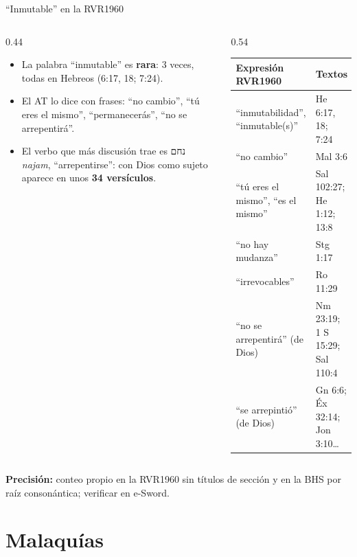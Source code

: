 \documentclass[hyperref={bookmarks=false},aspectratio=169]{beamer}
\newcommand{\heb}[1]{\mbox{\foreignlanguage{hebrew}{#1}}}
\newcommand{\destacar}[1]{\textbf{\textcolor{azul}{#1}}}
\newcommand{\precision}[1]{{\footnotesize\color{gris}\textbf{Precisión:} #1}}
\begin{document}
\begin{frame}{``Inmutable'' en la RVR1960}
\begin{columns}[c,onlytextwidth]
\begin{column}{0.44\textwidth}\footnotesize
\begin{itemize}
\item La palabra ``inmutable'' es \destacar{rara}: 3 veces, todas en Hebreos (6:17, 18; 7:24).
\item El AT lo dice con frases: ``no cambio'', ``tú eres el mismo'', ``permanecerás'', ``no se arrepentirá''.
\item El verbo que más discusión trae es \heb{נחם} \emph{najam}, ``arrepentirse'': con Dios como sujeto aparece en unos \textbf{34 versículos}.
\end{itemize}
\end{column}
\begin{column}{0.54\textwidth}
\scriptsize\renewcommand{\arraystretch}{1.12}
\begin{tabular}{@{}>{\RaggedRight\arraybackslash}p{2.9cm}>{\RaggedRight\arraybackslash}p{3.2cm}@{}}
\toprule
\textbf{Expresión RVR1960} & \textbf{Textos} \\ \midrule
``inmutabilidad'', ``inmutable(s)'' & He 6:17, 18; 7:24 \\
``no cambio'' & Mal 3:6 \\
``tú eres el mismo'', ``es el mismo'' & Sal 102:27; He 1:12; 13:8 \\
``no hay mudanza'' & Stg 1:17 \\
``irrevocables'' & Ro 11:29 \\
``no se arrepentirá'' (de Dios) & Nm 23:19; 1 S 15:29; Sal 110:4 \\
``se arrepintió'' (de Dios) & Gn 6:6; Éx 32:14; Jon 3:10\ldots \\
\bottomrule
\end{tabular}
\end{column}
\end{columns}\par\smallskip
\precision{conteo propio en la RVR1960 sin títulos de sección y en la BHS por raíz consonántica; verificar en e-Sword.}
\end{frame}

\section{Malaquías}
\end{document}
